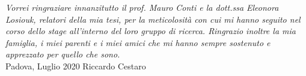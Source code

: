 


\emph{Vorrei ringraziare innanzitutto il prof. Mauro Conti e la dott.ssa Eleonora Losiouk, relatori della mia tesi, per la meticolosità con cui mi hanno seguito nel corso dello stage all'interno del loro gruppo di ricerca.
Ringrazio inoltre la mia famiglia, i miei parenti e i miei amici che mi hanno sempre sostenuto e apprezzato per quello che sono.}\\


Padova, Luglio 2020
\hfill
Riccardo Cestaro
